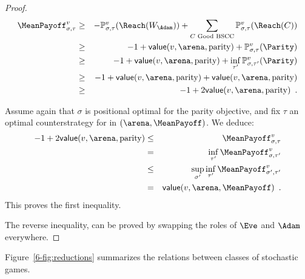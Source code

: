 \begin{proof}
\begin{eqnarray*}
  \MeanPayoff_{\sigma,\tau}^{v} & \geq & - \probm_{\sigma,\tau}^v(\Reach(W_\Adam)) + \sum_{C \textrm{ Good BSCC}} \probm_{\sigma,\tau}^v(\Reach(C))\\
                                & \geq & -1 + \mathsf{value}(v,\arena,\textrm{parity}) + \probm_{\sigma,\tau}^v(\Parity)\\
                                & \geq & -1 + \mathsf{value}(v,\arena,\textrm{parity}) + \inf_{\tau'} \probm_{\sigma,\tau'}^v(\Parity)\\
                                & \geq & -1 + \mathsf{value}(v,\arena,\textrm{parity}) + \mathsf{value}(v,\arena,\textrm{parity})\\
                                &  \geq & -1 + 2  \mathsf{value}(v,\arena,\textrm{parity}) \enspace.
\end{eqnarray*}

Assume again that $\sigma$ is positional optimal for the parity objective, and fix $\tau$ an optimal counterstrategy for \Adam in $(\arena,\MeanPayoff)$. We deduce:
\begin{eqnarray*}
  -1 + 2 \mathsf{value}(v,\arena,\textrm{parity}) & \leq & 
                                                           \MeanPayoff_{\sigma,\tau}^{v}\\
                                                  & = & \inf_{\tau'}
                                                        \MeanPayoff_{\sigma,\tau'}^{v}\\
                                                  & \leq &
                                                            \sup_{\sigma'}\inf_{\tau'}
                                                           \MeanPayoff_{\sigma',\tau'}^{v}\\
                                                  & = & 
                                                        \mathsf{value}(v,\arena,\MeanPayoff) \enspace.
\end{eqnarray*} 
This proves the first inequality.

The reverse inequality, can be proved by swapping the roles of $\Eve$ and $\Adam$ everywhere.
\end{proof}

Figure~\cref{6-fig:reductions} summarizes the relations between classes
of stochastic games.
